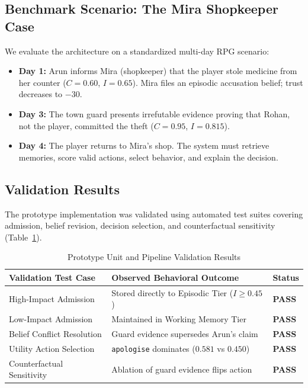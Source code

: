 \documentclass[conference]{IEEEtran}
\begin{document}
\subsection{Benchmark Scenario: The Mira Shopkeeper Case}
We evaluate the architecture on a standardized multi-day RPG scenario:
\begin{itemize}
    \item \textbf{Day 1:} Arun informs Mira (shopkeeper) that the player stole medicine from her counter ($C = 0.60$, $I = 0.65$). Mira files an episodic accusation belief; trust decreases to $-30$.
    \item \textbf{Day 3:} The town guard presents irrefutable evidence proving that Rohan, not the player, committed the theft ($C = 0.95$, $I = 0.815$).
    \item \textbf{Day 4:} The player returns to Mira's shop. The system must retrieve memories, score valid actions, select behavior, and explain the decision.
\end{itemize}

\subsection{Validation Results}
The prototype implementation was validated using automated test suites covering admission, belief revision, decision selection, and counterfactual sensitivity (Table~\ref{tab:results}).

\begin{table}[htbp]
\caption{Prototype Unit and Pipeline Validation Results}
\begin{center}
\begin{tabular}{lll}
\toprule
\textbf{Validation Test Case} & \textbf{Observed Behavioral Outcome} & \textbf{Status} \\
\midrule
High-Impact Admission & Stored directly to Episodic Tier ($I \ge 0.45$) & \textbf{PASS} \\
Low-Impact Admission & Maintained in Working Memory Tier & \textbf{PASS} \\
Belief Conflict Resolution & Guard evidence supersedes Arun's claim & \textbf{PASS} \\
Utility Action Selection & \texttt{apologise} dominates ($0.581$ vs $0.450$) & \textbf{PASS} \\
Counterfactual Sensitivity & Ablation of guard evidence flips action & \textbf{PASS} \\
\bottomrule
\end{tabular}
\label{tab:results}
\end{center}
\end{table}
\end{document}
